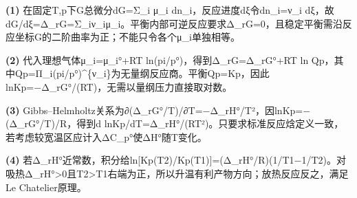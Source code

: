 \par\noindent\textbf{(1)} 在固定T,p下G总微分dG=Σ\_i μ\_i dn\_i，反应进度dξ令dn\_i=ν\_i dξ，故dG/dξ=Δ\_rG=Σ\_iν\_iμ\_i。平衡内部可逆反应要求Δ\_rG=0，且稳定平衡需沿反应坐标G的二阶曲率为正；不能只令各个μ\_i单独相等。
\par\noindent\textbf{(2)} 代入理想气体μ\_i=μ\_i°+RT ln(pi/p°)，得到Δ\_rG=Δ\_rG°+RT ln Qp，其中Qp=Π\_i(pi/p°)\textasciicircum{}\{ν\_i\}为无量纲反应商。平衡Qp=Kp，因此lnKp=−Δ\_rG°/(RT)，无需以量纲压力直接取对数。
\par\noindent\textbf{(3)} Gibbs–Helmholtz关系为∂(Δ\_rG°/T)/∂T=−Δ\_rH°/T²，因lnKp=−(Δ\_rG°/T)/R，得到d lnKp/dT=Δ\_rH°/(RT²)。只要求标准反应焓定义一致，若考虑较宽温区应计入ΔC\_p°使ΔH°随T变化。
\par\noindent\textbf{(4)} 若Δ\_rH°近常数，积分给ln[Kp(T2)/Kp(T1)]=(Δ\_rH°/R)(1/T1−1/T2)。对吸热Δ\_rH°>0且T2>T1右端为正，所以升温有利产物方向；放热反应反之，满足Le Chatelier原理。
